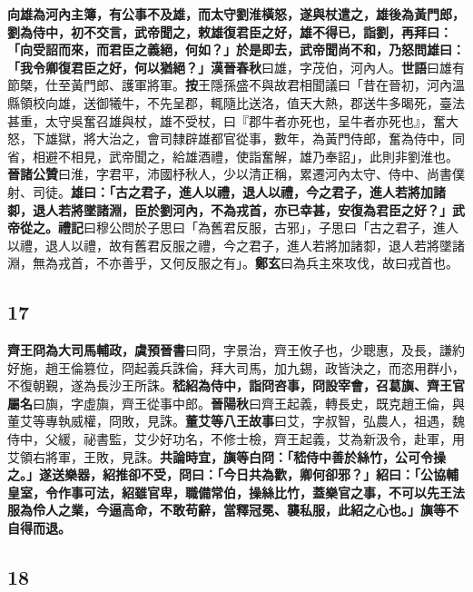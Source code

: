 \textbf{向雄為河內主簿，有公事不及雄，而太守劉淮橫怒，遂與杖遣之，雄後為黃門郎，劉為侍中，初不交言，武帝聞之，敕雄復君臣之好，雄不得已，詣劉，再拜曰：「向受詔而來，而君臣之義絕，何如？」於是即去，武帝聞尚不和，乃怒問雄曰：「我令卿復君臣之好，何以猶絕？」}{\footnotesize \textbf{漢晉春秋}曰雄，字茂伯，河內人。\textbf{世語}曰雄有節槩，仕至黃門郎、護軍將軍。\textbf{按}王隱孫盛不與故君相聞議曰「昔在晉初，河內溫縣領校向雄，送御犧牛，不先呈郡，輒隨比送洛，值天大熱，郡送牛多暍死，臺法甚重，太守吳奮召雄與杖，雄不受杖，曰『郡牛者亦死也，呈牛者亦死也』，奮大怒，下雄獄，將大治之，會司隸辟雄都官從事，數年，為黃門侍郎，奮為侍中，同省，相避不相見，武帝聞之，給雄酒禮，使詣奮解，雄乃奉詔」，此則非劉淮也。\textbf{晉諸公贊}曰淮，字君平，沛國杼秋人，少以清正稱，累遷河內太守、侍中、尚書僕射、司徒。}\textbf{雄曰：「古之君子，進人以禮，退人以禮，今之君子，進人若將加諸厀，退人若將墜諸淵，臣於劉河內，不為戎首，亦已幸甚，安復為君臣之好？」武帝從之。}{\footnotesize \textbf{禮記}曰穆公問於子思曰「為舊君反服，古邪」，子思曰「古之君子，進人以禮，退人以禮，故有舊君反服之禮，今之君子，進人若將加諸厀，退人若將墜諸淵，無為戎首，不亦善乎，又何反服之有」。\textbf{鄭玄}曰為兵主來攻伐，故曰戎首也。}

\subsection*{17}

\textbf{齊王冏為大司馬輔政，}{\footnotesize \textbf{虞預晉書}曰冏，字景治，齊王攸子也，少聰惠，及長，謙約好施，趙王倫篡位，冏起義兵誅倫，拜大司馬，加九錫，政皆決之，而恣用群小，不復朝覲，遂為長沙王所誅。}\textbf{嵇紹為侍中，詣冏咨事，冏設宰會，召葛旟、}{\footnotesize \textbf{齊王官屬名}曰旟，字虛旟，齊王從事中郎。\textbf{晉陽秋}曰齊王起義，轉長史，既克趙王倫，與董艾等專執威權，冏敗，見誅。}\textbf{董艾等}{\footnotesize \textbf{八王故事}曰艾，字叔智，弘農人，祖遇，魏侍中，父緩，祕書監，艾少好功名，不修士檢，齊王起義，艾為新汲令，赴軍，用艾領右將軍，王敗，見誅。}\textbf{共論時宜，旟等白冏：「嵇侍中善於絲竹，公可令操之。」遂送樂器，紹推卻不受，冏曰：「今日共為歡，卿何卻邪？」紹曰：「公協輔皇室，令作事可法，紹雖官卑，職備常伯，操絲比竹，蓋樂官之事，不可以先王法服為伶人之業，今逼高命，不敢苟辭，當釋冠冕、襲私服，此紹之心也。」旟等不自得而退。}

\subsection*{18}

